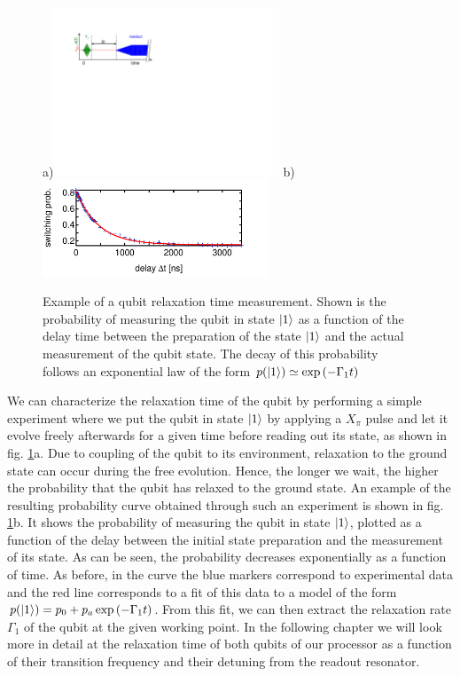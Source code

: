 \begin{figure}[ht!]
\centering
a)\includegraphics[width=0.6\textwidth]{"./material/figures/measurement/qubit_t1_measurement"}
b)\includegraphics[width=0.6\textwidth]{"./data/ct5/2011_04_21 - grover and tomo/example - qubit 2 t1"}
\caption[]{Example of a qubit relaxation time measurement. Shown is the probability of measuring the qubit in state $\left| 1 \right>$ as a function of the delay time between the preparation of the state $\left| 1 \right>$ and the actual measurement of the qubit state. The decay of this probability follows an exponential law of the form $p(\left| 1 \right>)\simeq\exp{(-\Gamma_1 t)}$}
\label{fig:qubit_t1_example}
\end{figure}

We can characterize the relaxation time of the qubit by performing a simple experiment where we put the qubit in state $\left| 1 \right>$ by applying a $X_{\pi}$ pulse and let it evolve freely afterwards for a given time before reading out its state, as shown in fig. \ref{fig:qubit_t1_example}a. Due to coupling of the qubit to its environment, relaxation to the ground state can occur during the free evolution. Hence, the longer we wait, the higher the probability that the qubit has relaxed to the ground state. An example of the resulting probability curve obtained through such an experiment is shown in fig. \ref{fig:qubit_t1_example}b. It shows the probability of measuring the qubit in state $\left| 1 \right>$, plotted as a function of the delay between the initial state preparation and the measurement of its state. As can be seen, the probability decreases exponentially as a function of time. As before, in the curve the blue markers correspond to experimental data and the red line corresponds to a fit of this data to a model of the form $p(\left| 1 \right>) = p_0+p_a\exp{(-\Gamma_1 t)}$. From this fit, we can then extract the relaxation rate $\Gamma_1$ of the qubit at the given working point. In the following chapter we will look more in detail at the relaxation time of both qubits of our processor as a function of their transition frequency and their detuning from the readout resonator.